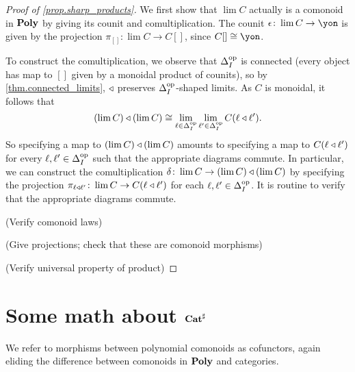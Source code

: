 \documentclass[Book-Poly]{subfiles}
\begin{document}
\begin{proof}[Proof of \cref{prop.sharp_products}]
We first show that $\lim C$ actually is a comonoid in $\mathbf{Poly}$ by giving its counit and comultiplication.
The counit $\epsilon \colon \lim C \to \yon$ is given by the projection $\pi_{[]} \colon \lim C \to C[]$, since $C[] \iso \yon$.

To construct the comultiplication, we observe that $\Delta_I^{\textnormal{op}}$ is connected (every object has map to $[]$ given by a monoidal product of counits), so by \cref{thm.connected_limits}, $\mathbin{\triangleleft}$ preserves $\Delta_I^{\textnormal{op}}$-shaped limits.
As $C$ is monoidal, it follows that
\[
    (\lim C) \mathbin{\triangleleft} (\lim C) \cong \lim_{\ell \in \Delta_I^{\textnormal{op}}} \lim_{\ell' \in \Delta_I^{\textnormal{op}}} C(\ell \mathbin{\triangleleft} \ell').
\]
So specifying a map to $(\lim C) \mathbin{\triangleleft} (\lim C)$ amounts to specifying a map to $C(\ell \mathbin{\triangleleft} \ell')$ for every $\ell, \ell' \in \Delta_I^{\textnormal{op}}$ such that the appropriate diagrams commute.
In particular, we can construct the comultiplication $\delta \colon \lim C \to (\lim C) \mathbin{\triangleleft} (\lim C)$ by specifying the projection $\pi_{\ell \mathbin{\triangleleft} \ell'} \colon \lim C \to C(\ell \mathbin{\triangleleft} \ell')$ for each $\ell, \ell' \in \Delta_I^{\textnormal{op}}$.
It is routine to verify that the appropriate diagrams commute.

(Verify comonoid laws)

(Give projections; check that these are comonoid morphisms)

(Verify universal property of product)
\end{proof}

\section{Some math about $\mathbf{Cat}^\sharp$}
We refer to morphisms between polynomial comonoids as cofunctors, again eliding the difference between comonoids in $\mathbf{Poly}$ and categories.
\end{document}

